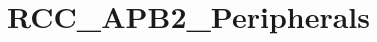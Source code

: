 \hypertarget{group___r_c_c___a_p_b2___peripherals}{\section{R\-C\-C\-\_\-\-A\-P\-B2\-\_\-\-Peripherals}
\label{group___r_c_c___a_p_b2___peripherals}
}
